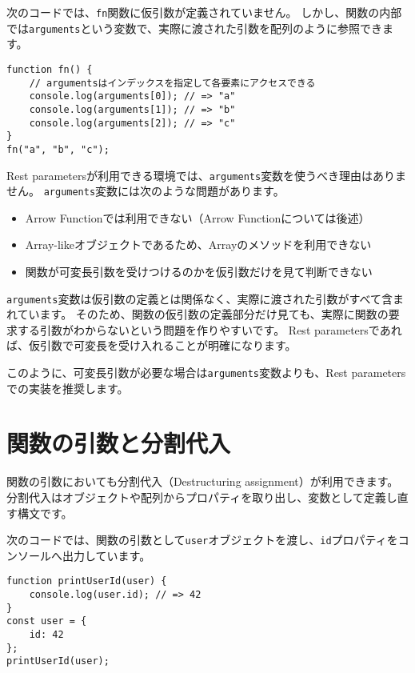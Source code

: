 次のコードでは、\texttt{fn}関数に仮引数が定義されていません。
しかし、関数の内部では\texttt{arguments}という変数で、実際に渡された引数を配列のように参照できます。

\begin{lstlisting}
function fn() {
    // argumentsはインデックスを指定して各要素にアクセスできる
    console.log(arguments[0]); // => "a" 
    console.log(arguments[1]); // => "b" 
    console.log(arguments[2]); // => "c" 
}
fn("a", "b", "c");
\end{lstlisting}

Rest
parametersが利用できる環境では、\texttt{arguments}変数を使うべき理由はありません。
\texttt{arguments}変数には次のような問題があります。

\begin{itemize}
\item
  Arrow Functionでは利用できない（Arrow Functionについては後述）
\item
  Array-likeオブジェクトであるため、Arrayのメソッドを利用できない
\item
  関数が可変長引数を受けつけるのかを仮引数だけを見て判断できない
\end{itemize}

\texttt{arguments}変数は仮引数の定義とは関係なく、実際に渡された引数がすべて含まれています。
そのため、関数の仮引数の定義部分だけ見ても、実際に関数の要求する引数がわからないという問題を作りやすいです。
Rest parametersであれば、仮引数で可変長を受け入れることが明確になります。

このように、可変長引数が必要な場合は\texttt{arguments}変数よりも、Rest
parametersでの実装を推奨します。

\hypertarget{function-destructuring}{%
\section[関数の引数と分割代入]{関数の引数と分割代入\protect{}}\label{function-destructuring}}

関数の引数においても分割代入（Destructuring assignment）が利用できます。
分割代入はオブジェクトや配列からプロパティを取り出し、変数として定義し直す構文です。

次のコードでは、関数の引数として\texttt{user}オブジェクトを渡し、\texttt{id}プロパティをコンソールへ出力しています。

\begin{lstlisting}
function printUserId(user) {
    console.log(user.id); // => 42
}
const user = {
    id: 42
};
printUserId(user);
\end{lstlisting}

